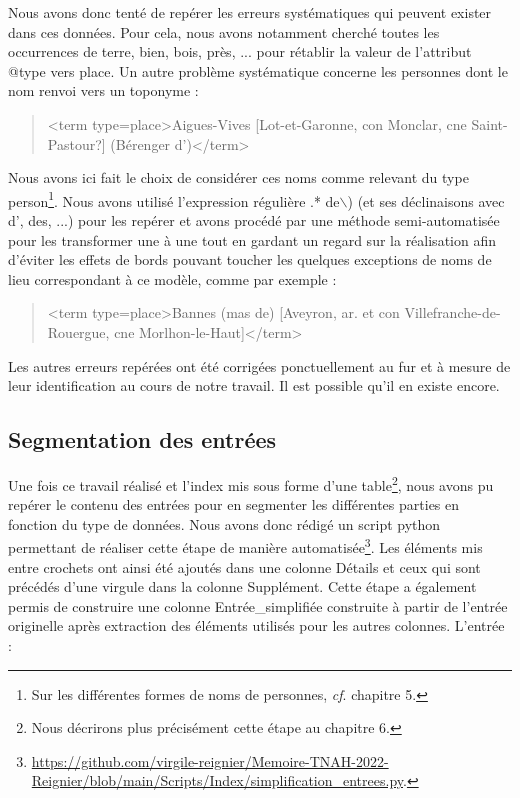 \documentclass[a4paper,12pt,twoside]{book}
\begin{document}
	\noindent Nous avons donc tenté de repérer les erreurs systématiques qui peuvent exister dans ces données. Pour cela, nous avons notamment cherché toutes les occurrences de \og terre\fg{}, \og bien\fg{}, \og bois\fg{}, \og près\fg{}, ... pour rétablir la valeur de l'attribut @type vers \og place\fg{}. Un autre problème systématique concerne les personnes dont le nom renvoi vers un toponyme :
	
	\begin{quotation}
		<term type=\textquotesingle place\textquotesingle >Aigues-Vives [Lot-et-Garonne, con Monclar, cne Saint-Pastour?]
			(Bérenger d')</term>
	\end{quotation}

	\noindent Nous avons ici fait le choix de considérer ces noms comme relevant du type \og person\fg{}\footnote{Sur les différentes formes de noms de personnes, \textit{cf}. chapitre 5.}. Nous avons utilisé l'expression régulière \og [A-Z].* de$\backslash$)\fg{} (et ses déclinaisons avec \og d'\fg{}, \og des\fg{}, ...) pour les repérer et avons procédé par une méthode semi-automatisée pour les transformer une à une tout en gardant un regard sur la réalisation afin d'éviter les effets de bords pouvant toucher les quelques exceptions de noms de lieu correspondant à ce modèle, comme par exemple :
	
	\begin{quotation}
    	<term type=\textquotesingle place\textquotesingle >Bannes (mas de) [Aveyron, ar. et con Villefranche-de-Rouergue,
			cne Morlhon-le-Haut]</term>
	\end{quotation}
	
	\noindent Les autres erreurs repérées ont été corrigées ponctuellement au fur et à mesure de leur identification au cours de notre travail. Il est possible qu'il en existe encore.
	
	\subsection{Segmentation des entrées}
	
	Une fois ce travail réalisé et l'index mis sous forme d'une table\footnote{Nous décrirons plus précisément cette étape au chapitre 6.}, nous avons pu repérer le contenu des entrées pour en segmenter les différentes parties en fonction du type de données. Nous avons donc rédigé un script python permettant de réaliser cette étape de manière automatisée\footnote{\url{https://github.com/virgile-reignier/Memoire-TNAH-2022-Reignier/blob/main/Scripts/Index/simplification_entrees.py}.}. Les éléments mis entre crochets ont ainsi été ajoutés dans une colonne \og Détails\fg{} et ceux qui sont précédés d'une virgule dans la colonne \og Supplément\fg{}. Cette étape a également permis de construire une colonne \og Entrée\_simplifiée\fg{} construite à partir de l'entrée originelle après extraction des éléments utilisés pour les autres colonnes. L'entrée :
	
\end{document}
